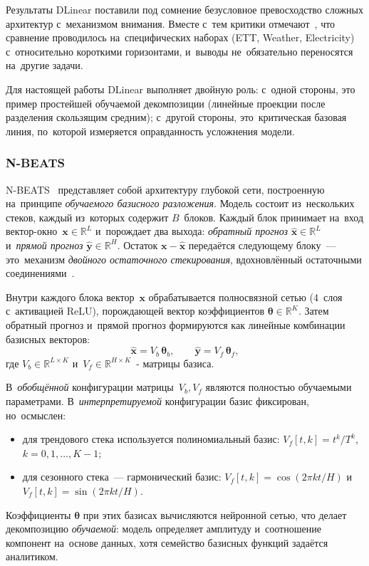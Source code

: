Результаты DLinear поставили под сомнение безусловное превосходство
сложных архитектур с~механизмом внимания.  Вместе с~тем критики
отмечают~\cite{wen2023transformers}, что сравнение проводилось
на~специфических наборах (ETT, Weather, Electricity) с~относительно
короткими горизонтами, и~выводы не~обязательно переносятся на~другие
задачи.

Для настоящей работы DLinear выполняет двойную роль: с~одной стороны,
это пример простейшей обучаемой декомпозиции (линейные проекции после
разделения скользящим средним); с~другой стороны, это~критическая
базовая линия, по~которой измеряется оправданность усложнения модели.


\subsubsection{N-BEATS}
\label{sssec:nbeats}

N-BEATS~\cite{oreshkin2020nbeats} представляет собой архитектуру
глубокой сети, построенную на~принципе \textit{обучаемого базисного
разложения}.  Модель состоит из~нескольких стеков, каждый
из~которых содержит $B$~блоков.  Каждый блок принимает на~вход
вектор-окно~$\mathbf{x} \in \mathbb{R}^L$ и~порождает два выхода:
\textit{обратный прогноз} $\hat{\mathbf{x}} \in \mathbb{R}^L$
и~\textit{прямой прогноз} $\hat{\mathbf{y}} \in \mathbb{R}^H$.
Остаток $\mathbf{x} - \hat{\mathbf{x}}$ передаётся следующему блоку~---
это~механизм \textit{двойного остаточного стекирования}, вдохновлённый остаточными соединениями~\cite{he2016resnet}.

Внутри каждого блока вектор~$\mathbf{x}$ обрабатывается полносвязной
сетью (4~слоя с~активацией ReLU), порождающей вектор коэффициентов
$\boldsymbol{\theta} \in \mathbb{R}^K$.  Затем обратный прогноз
и~прямой прогноз формируются как линейные комбинации базисных векторов:
\begin{equation}
\label{eq:nbeats-basis}
\hat{\mathbf{x}} = V_b\,\boldsymbol{\theta}_b, \qquad
\hat{\mathbf{y}} = V_f\,\boldsymbol{\theta}_f,
\end{equation}
где $V_b \in \mathbb{R}^{L \times K}$ и~$V_f \in \mathbb{R}^{H \times K}$~-
матрицы базиса.

В~\textit{обобщённой} конфигурации матрицы~$V_b, V_f$ являются
полностью обучаемыми параметрами.  В~\textit{интерпретируемой}
конфигурации базис фиксирован, но~осмыслен:
\begin{itemize}[nosep]
\item для трендового стека используется полиномиальный базис:
   $V_{f}[t, k] = t^k / T^k$, $k = 0, 1, \ldots, K-1$;
\item для сезонного стека~--- гармонический базис:
   $V_{f}[t, k] = \cos(2\pi k t / H)$ и
   $V_{f}[t, k] = \sin(2\pi k t / H)$.
\end{itemize}
Коэффициенты $\boldsymbol{\theta}$ при этих базисах вычисляются
нейронной сетью, что делает декомпозицию \textit{обучаемой}: модель
определяет амплитуду и~соотношение компонент на~основе данных, хотя
семейство базисных функций задаётся аналитиком.

